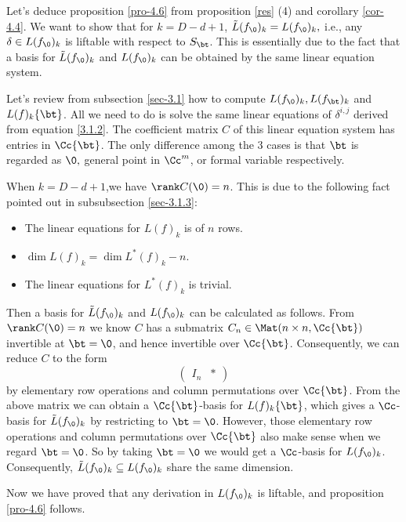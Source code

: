 Let's deduce proposition \ref{pro-4.6} from proposition \ref{res} (4) and corollary \ref{cor-4.4}. We want to show that for $k=D-d+1$, $\tilde L(f_\0)_k = L(f_\0)_k,$ i.e., any $\delta \in L(f_\0)_k$ is liftable with respect to   $S_\bt$. This is essentially due to the fact that a basis for $\tilde L(f_\0)_k $ and $L(f_\0)_k$ can be obtained by the same linear equation system.

Let's review from subsection \ref{sec-3.1} how to compute $L(f_\0)_k, L(f_\bt)_k$ and $L(f)_k\{\bt\}$.  All we need to do is solve the same linear equations of $\delta^{i,j}$ derived from equation \eqref{3.1.2}. The coefficient matrix $C$ of this linear equation system has entries in $\Cc\{\bt\}$.  The only difference among the 3 cases is that $\bt$ is regarded as $\0,$ general point in $\Cc^m$, or formal variable respectively. 

When $k=D-d+1$,we have $\rank C(\0)=n$. This is due to the following fact pointed out in subsubsection \ref{sec-3.1.3}:
\begin{itemize}
  \item The linear equations for $L(f)_k$ is of $n$ rows.
  \item $\dim L(f)_{k}=\dim L^*(f)_k-n$.
  \item The linear equations for $L^*(f)_k$ is trivial.
\end{itemize}

Then a basis for $\tilde L(f_\0)_k$ and $L(f_\0)_k$  can be calculated as follows. From $\rank C(\0)=n$ we know $C$ has a submatrix  $C_n\in \Mat(n\times n , \Cc\{\bt\})$  invertible at $\bt=\0$, and hence invertible over $\Cc\{\bt\}$. Consequently, we can reduce $C$ to the form
\[\begin{pmatrix}
  I_n & *
\end{pmatrix}\]
by elementary row operations and column permutations over $\Cc\{\bt\}$.  From the above matrix we can obtain a $\Cc\{\bt\}$-basis for $L(f)_k\{\bt\}$, which gives a $\Cc$-basis for $\tilde L(f_\0)_k$ by restricting to $\bt=\0$.  However, those  elementary row operations and column permutations over $\Cc\{\bt\}$ also make sense when we regard $\bt=\0$. So by taking $\bt=\0$ we would get a $\Cc$-basis for $L(f_\0)_k$.  Consequently, $\tilde L(f_\0)_k \subseteq L(f_\0)_k$ share the same dimension.

Now we have proved that any derivation in $L(f_\0)_k$ is liftable, and proposition \ref{pro-4.6}  follows.

